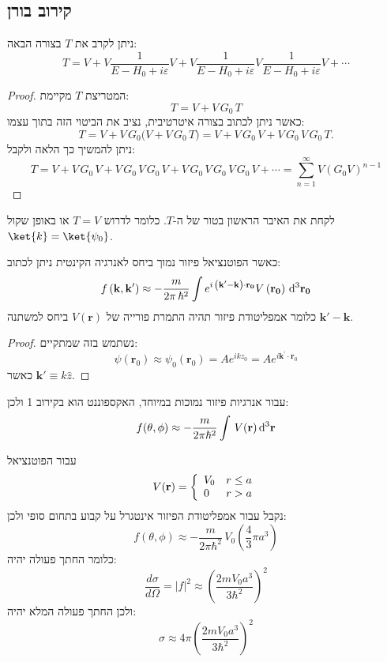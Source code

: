 \documentclass{tstextbook}
\begin{document}
\subsection{קירוב בורן}

\begin{proposition}
ניתן לקרב את \(T\) בצורה הבאה:
$$T=V+V{\frac{1}{E-H_{0}+i\varepsilon}}V+V{\frac{1}{E-H_{0}+i\varepsilon}}V{\frac{1}{E-H_{0}+i\varepsilon}}V+\cdots$$

\end{proposition}
\begin{proof}
המטריצת \(T\) מקיימת:
$$T=V+V\,G_{0}\,T$$
כאשר ניתן לכתוב בצורה איטרטיבית, נציב את הביטוי הזה בתוך עצמו:
$$T=V+V\,G_{0}\Big(V+V\,G_{0}\,T\Big)=V+V\,G_{0}\,V+V\,G_{0}\,V\,G_{0}\,T.$$
ניתן להמשיך כך הלאה ולקבל:
$$T=V+V\,G_{0}\,V+V\,G_{0}\,V\,G_{0}\,V+V\,G_{0}\,V\,G_{0}\,V\,G_{0}\,V+\cdots=\sum_{n=1}^{\infty}V(G_{0}V)^{n-1}$$

\end{proof}
\begin{definition}
לקחת את האיבר הראשון בטור של ה-\(T\). כלומר לדרוש \(T=V\) או באופן שקול \(\ket{k}=\ket{\psi_{0}}\). 

\end{definition}
\begin{proposition}
כאשר הפוטנציאל פיזור נמוך ביחס לאנרגיה הקינטית ניתן לכתוב:
$$f\left( \mathbf{k},\mathbf{k'} \right)\approx-\frac{m}{2\pi\,\hbar^{2}}\int e^{i\,\left( {\bf k^{\prime}-k} \right)\cdot{\bf r_{0}}}V\left( {\bf r_{0}} \right)\,\mathrm{d}^3{\bf r_{0}}$$
כלומר אמפליטודת פיזור תהיה התמרת פורייה של \(V\left( \mathbf{r} \right)\) ביחס למשתנה \(\mathbf{k'-k}\).

\end{proposition}
\begin{proof}
נשתמש בזה שמתקיים:
$$\psi(\mathbf{r}_{0})\approx\psi_{0}(\mathbf{r}_{0})=A e^{i k z_{0}}=A e^{i\mathbf{k^{\prime}}\cdot\mathbf{r}_{0}}$$
כאשר \(\mathbf{k}'\equiv k\hat{z}\). 

\end{proof}
\begin{corollary}
עבור אנרגיות פיזור נמוכות במיוחד, האקספוננט הוא בקירוב 1 ולכן:
$$f(\theta,\phi)\approx-\frac{m}{2\pi\hbar^{2}}\int\,V({\bf r})\,\mathrm{d}^3{\bf r}$$

\end{corollary}
\begin{example}
עבור הפוטנציאל
$$V({\bf r})=\left\{\begin{array}{l l}{{V_{0}}}&{{r\leq a}}\\ {{0}}&{{r>a}}\end{array}\right.$$
נקבל עבור אמפליטודת הפיזור אינטגרל על קבוע בתחום סופי ולכן:
$$f(\theta,\phi)\approx-\frac{m}{2\pi\hbar^{2}}\,V_{0}\left(\frac{4}{3}\pi a^{3}\right)$$
כלומר החתך פעולה יהיה:
$$\frac{d\sigma}{d\Omega}=|f|^{2}\approx\left(\frac{2m V_{0}a^{3}}{3\hbar^{2}}\right)^{2}$$
ולכן החתך פעולה המלא יהיה:
$$\sigma\approx4\pi\left(\frac{2m V_{0}a^{3}}{3\hbar^{2}}\right)^{2}$$

\end{example}
\end{document}
